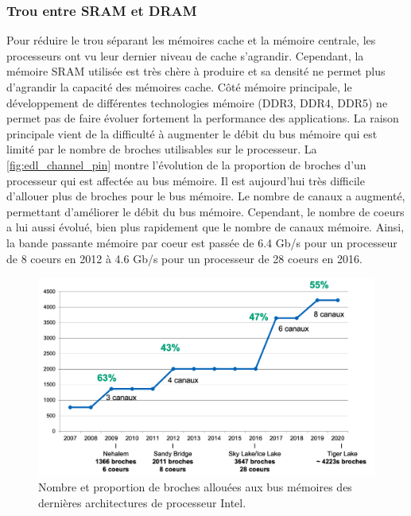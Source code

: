     \subsubsection{Trou entre SRAM et DRAM} 
        Pour réduire le trou séparant les mémoires cache et la mémoire centrale, les processeurs ont vu leur dernier niveau de cache s'agrandir. Cependant, la mémoire SRAM utilisée est très chère à produire et sa densité ne permet plus d'agrandir la capacité des mémoires cache. Côté mémoire principale, le développement de différentes technologies mémoire (DDR3, DDR4, DDR5) ne permet pas de faire évoluer fortement la performance des applications. La raison principale vient de la difficulté à augmenter le débit du bus mémoire qui est limité par le nombre de broches utilisables sur le processeur. La \autoref{fig:edl_channel_pin} montre l'évolution de la proportion de broches d'un processeur qui est affectée au bus mémoire. Il est aujourd'hui très difficile d'allouer plus de broches pour le bus mémoire. Le nombre de canaux a augmenté, permettant d'améliorer le débit du bus mémoire. Cependant, le nombre de coeurs a lui aussi évolué, bien plus rapidement que le nombre de canaux mémoire. Ainsi, la bande passante mémoire par coeur est passée de 6.4 Gb/s pour un processeur de 8 coeurs en 2012 à 4.6 Gb/s pour un processeur de 28 coeurs en 2016. 
        
        \begin{figure}
            \center
            \includegraphics[width=12cm]{images/edl_channel_pin.png}
            \caption{\label{fig:edl_channel_pin} Nombre et proportion de broches allouées aux bus mémoires des dernières architectures de processeur Intel.}
        \end{figure}
    
